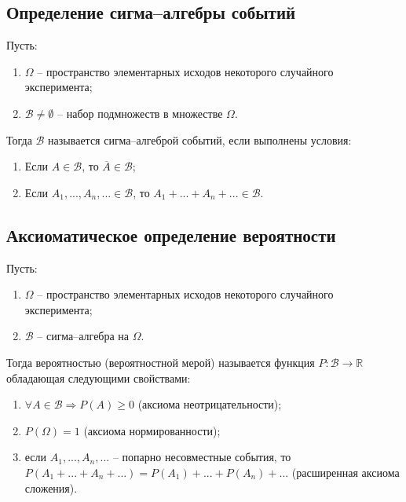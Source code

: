 \subsection*{Определение сигма--алгебры событий}

Пусть:
\begin{enumerate}[label=\arabic*)]
	\item $\Omega$ -- пространство элементарных исходов некоторого случайного эксперимента;
	\item $\mathcal{B} \neq \emptyset$ -- набор подмножеств в множестве $\Omega$.
\end{enumerate}

Тогда $\mathcal{B}$ называется сигма--алгеброй событий, если выполнены условия:

\begin{enumerate}[label=\arabic*)]
	\item Если $A \in \mathcal{B}$, то $\overline{A} \in \mathcal{B}$;
	\item Если $A_1, ..., A_n, ... \in \mathcal{B}$, то $A_1 + ... + A_n + ... \in \mathcal{B}$.
\end{enumerate}

\subsection*{Аксиоматическое определение вероятности}

Пусть:
\begin{enumerate}[label=\arabic*)]
	\item $\Omega$ -- пространство элементарных исходов некоторого случайного эксперимента;
	\item $\mathcal{B}$ -- сигма--алгебра на $\Omega$.
\end{enumerate}

Тогда вероятностью (вероятностной мерой) называется функция $P: \mathcal{B} \rightarrow \mathbb{R}$ обладающая следующими свойствами: 

\begin{enumerate}[label=\arabic*)]
	\item $\forall A \in \mathcal{B} \Rightarrow P(A) \geq 0$ (аксиома неотрицательности);
	\item $P(\Omega) = 1$ (аксиома нормированности);
	\item если $A_1, ..., A_n,...$ -- попарно несовместные события, то $P(A_1 +...+A_n +...) = P(A_1)+...+P(A_n)+...$ (расширенная аксиома сложения).
\end{enumerate}

